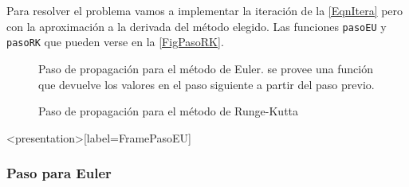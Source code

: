 
Para resolver el problema vamos a implementar la iteración de la \autoref{EqnItera}
pero con la aproximación a la derivada del método elegido. 
Las funciones \texttt{pasoEU} y \texttt{pasoRK} que pueden verse
en la \autoref{FigPasoRK}.

\begin{figure}[H]
  \caption{\protect\label{FigPasoEu} 
  Paso de propagación para el método de Euler. se provee una función que devuelve los valores en el paso
  siguiente a partir del paso previo.}
\end{figure}

\begin{figure}


  \caption{\protect\label{FigPasoRK}
  Paso de propagación para el método de Runge-Kutta
  }
\end{figure}

\mode*

\begin{frame}<presentation>[label=FramePasoEU]
  \frametitle{Paso para Euler}
    \center

    \begin{codeblock}
    \end{codeblock}

\end{frame}

